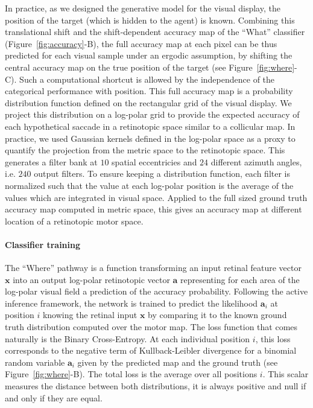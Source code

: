 In practice, as we designed the generative model for the visual display, the position of the target (which is hidden to the agent) is known. Combining this translational shift and the shift-dependent accuracy map of the ``What'' classifier (Figure~\ref{fig:accuracy}-B), the full accuracy map at each pixel can be thus predicted for each visual sample under an ergodic assumption, by shifting the central accuracy map on the true position of the target (see Figure~\ref{fig:where}-C). Such a computational shortcut is allowed by the independence of the categorical performance with position. This full accuracy map is a probability distribution function defined on the rectangular grid of the visual display. We project this distribution on a log-polar grid to provide the expected accuracy of each hypothetical saccade in a retinotopic space similar to a collicular map. In practice, we used Gaussian kernels defined in the log-polar space as a proxy to quantify the projection from the metric space to the retinotopic space. This generates a filter bank at $10$ spatial eccentricies and $24$ different azimuth angles, i.e. $240$ output filters. To ensure keeping a distribution function, each filter is normalized such that the value at each log-polar position is the average of the values which are integrated in visual space. Applied to the full sized ground truth accuracy map computed in metric space, this gives an accuracy map at different location of a retinotopic motor space. %
%
\paragraph{Classifier training}
The ``Where'' pathway is a function transforming an input retinal feature vector $\boldsymbol{x}$ into an output log-polar retinotopic vector $\boldsymbol{a}$ representing for each area of the log-polar visual field a prediction of the accuracy probability. Following the active inference framework, the network is trained to predict the likelihood $\boldsymbol{a}_i$ at position $i$ knowing the retinal input $\boldsymbol{x}$ by comparing it to the known ground truth distribution computed over the motor map. The loss function that comes naturally is the Binary Cross-Entropy. At each individual position $i$, this loss corresponds to the negative term of Kullback-Leibler divergence for a binomial random variable $\boldsymbol{a}_i$ given by the predicted map and the ground truth (see Figure~\ref{fig:where}-B).  The total loss is the average over all positions $i$. This scalar measures the distance between both distributions, it is always positive and null if and only if they are equal.

